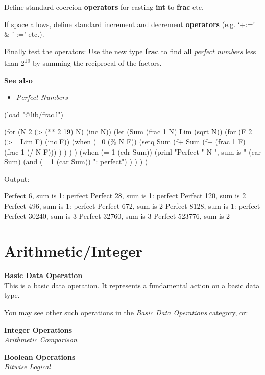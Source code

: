 Define standard coercion \textbf{operators} for casting \textbf{int} to
\textbf{frac} etc.

If space allows, define standard increment and decrement
\textbf{operators} (e.g. `+:=' \& '-:=' etc.).

Finally test the operators: Use the new type \textbf{frac} to find all
\emph{perfect numbers} less than 2\textsuperscript{19} by summing the
reciprocal of the factors.

\textbf{See also}

\begin{itemize}
\item
  \emph{Perfect Numbers}
\end{itemize}


\begin{wideverbatim}

(load "@lib/frac.l")

(for (N 2  (> (** 2 19) N)  (inc N))
   (let (Sum (frac 1 N)  Lim (sqrt N))
      (for (F 2  (>= Lim F) (inc F))
         (when (=0 (\% N F))
            (setq Sum
               (f+ Sum
                  (f+ (frac 1 F) (frac 1 (/ N F))) ) ) ) )
      (when (= 1 (cdr Sum))
         (prinl
            "Perfect " N
            ", sum is " (car Sum)
            (and (= 1 (car Sum)) ": perfect") ) ) ) )

Output:

Perfect 6, sum is 1: perfect
Perfect 28, sum is 1: perfect
Perfect 120, sum is 2
Perfect 496, sum is 1: perfect
Perfect 672, sum is 2
Perfect 8128, sum is 1: perfect
Perfect 30240, sum is 3
Perfect 32760, sum is 3
Perfect 523776, sum is 2
\end{wideverbatim}

\pagebreak{}
\section*{Arithmetic/Integer}

\textbf{Basic Data Operation}\\ This is a basic data operation. It
represents a fundamental action on a basic data type.

You may see other such operations in the
\emph{Basic Data Operations}
category, or:

\textbf{Integer Operations} \\ \emph{Arithmetic} \textbar{}
\emph{Comparison}

\textbf{Boolean Operations} \\ \emph{Bitwise}
\textbar{} \emph{Logical}

